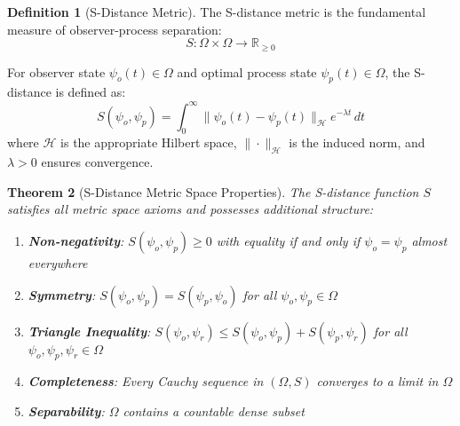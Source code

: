 \documentclass[11pt]{article}
\newtheorem{theorem}{Theorem}[section]
\theoremstyle{definition}
\newtheorem{definition}[theorem]{Definition}
\theoremstyle{remark}
\newcommand{\Real}{\mathbb{R}}
\newcommand{\Hilbert}{\mathcal{H}}
\begin{document}
\begin{definition}[S-Distance Metric]
The S-distance metric is the fundamental measure of observer-process separation:
\begin{equation}
S: \Omega \times \Omega \to \Real_{\geq 0}
\end{equation}

For observer state $\psi_o(t) \in \Omega$ and optimal process state $\psi_p(t) \in \Omega$, the S-distance is defined as:
\begin{equation}
S(\psi_o, \psi_p) = \int_0^{\infty} \|\psi_o(t) - \psi_p(t)\|_{\Hilbert} e^{-\lambda t} \, dt
\label{eq:s_distance_fundamental}
\end{equation}
where $\Hilbert$ is the appropriate Hilbert space, $\|\cdot\|_{\Hilbert}$ is the induced norm, and $\lambda > 0$ ensures convergence.
\end{definition}

\begin{theorem}[S-Distance Metric Space Properties]
\label{thm:metric_properties}
The S-distance function $S$ satisfies all metric space axioms and possesses additional structure:
\begin{enumerate}
\item \textbf{Non-negativity}: $S(\psi_o, \psi_p) \geq 0$ with equality if and only if $\psi_o = \psi_p$ almost everywhere
\item \textbf{Symmetry}: $S(\psi_o, \psi_p) = S(\psi_p, \psi_o)$ for all $\psi_o, \psi_p \in \Omega$
\item \textbf{Triangle Inequality}: $S(\psi_o, \psi_r) \leq S(\psi_o, \psi_p) + S(\psi_p, \psi_r)$ for all $\psi_o, \psi_p, \psi_r \in \Omega$
\item \textbf{Completeness}: Every Cauchy sequence in $(\Omega, S)$ converges to a limit in $\Omega$
\item \textbf{Separability}: $\Omega$ contains a countable dense subset
\end{enumerate}
\end{theorem}
\end{document}

